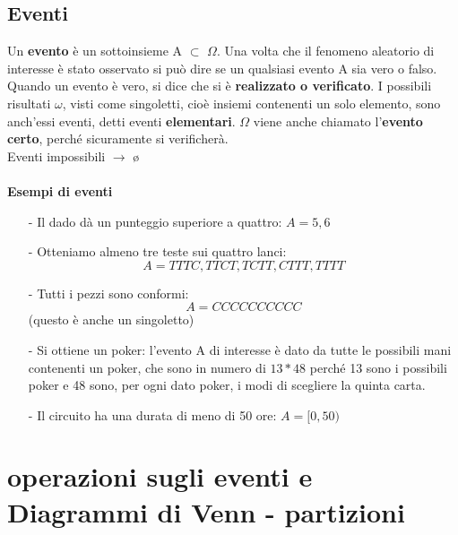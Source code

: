 \documentclass[12pt, letterpaper]{article}
\begin{document}
\subsection{Eventi}
Un \textbf{evento} è un sottoinsieme A $\subset$  $\Omega$. Una volta che il fenomeno aleatorio di interesse è stato osservato si
può dire se un qualsiasi evento A sia vero o falso. Quando un evento è vero, si dice che si è \textbf{realizzato o verificato}. I possibili risultati {$\omega$}, visti come singoletti, cioè insiemi contenenti
un solo elemento, sono anch’essi eventi, detti eventi \textbf{elementari}.
$\Omega$ viene anche chiamato l’\textbf{evento certo}, perché sicuramente si verificherà.\\
Eventi impossibili $\rightarrow$ ø
\\
\\
\textbf{Esempi di eventi}
\\
\begin{itemize}
   \item[-] Il dado dà un punteggio superiore a quattro: $A = {5, 6}$
   \item[-] Otteniamo almeno tre teste sui quattro lanci:
      \[A = {T T T C, T T CT, T CT T, CT T T, T T T T }\]
   \item[-] Tutti i pezzi sono conformi:
      \[A = {CCCCCCCCCC}\] (questo è anche un singoletto)
   \item[-] Si ottiene un poker: l’evento A di interesse è dato da tutte le possibili
      mani contenenti un poker, che sono in numero di \(13*48\) perché 13
   sono i possibili poker e 48 sono, per ogni dato poker, i modi di
   scegliere la quinta carta.
   \item[-] Il circuito ha una durata di meno di 50 ore: \(A = [0, 50)\)
\end{itemize}

\section{operazioni sugli eventi e Diagrammi di Venn - partizioni}
\end{document}
